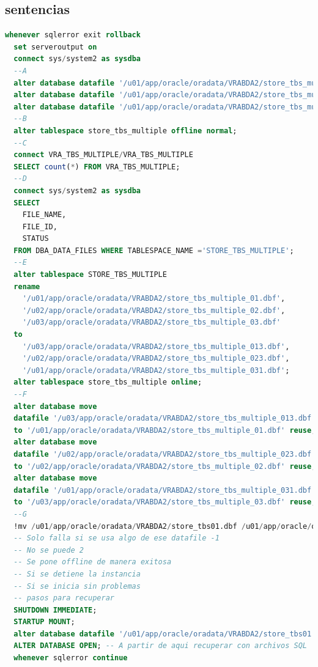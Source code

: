 \documentclass[journal]{IEEEtran}
\begin{document}
\subsection{sentencias}
\begin{lstlisting}[language=sql, caption=s-00-datafiles.sql,label={lst:codigo1}]
  whenever sqlerror exit rollback
  set serveroutput on
  connect sys/system2 as sysdba
  --A
  alter database datafile '/u01/app/oracle/oradata/VRABDA2/store_tbs_multiple_01.dbf' offline;
  alter database datafile '/u01/app/oracle/oradata/VRABDA2/store_tbs_multiple_02.dbf' offline;
  alter database datafile '/u01/app/oracle/oradata/VRABDA2/store_tbs_multiple_03.dbf' offline;
  --B
  alter tablespace store_tbs_multiple offline normal;
  --C
  connect VRA_TBS_MULTIPLE/VRA_TBS_MULTIPLE
  SELECT count(*) FROM VRA_TBS_MULTIPLE;
  --D
  connect sys/system2 as sysdba
  SELECT
    FILE_NAME,
    FILE_ID,
    STATUS
  FROM DBA_DATA_FILES WHERE TABLESPACE_NAME ='STORE_TBS_MULTIPLE';
  --E
  alter tablespace STORE_TBS_MULTIPLE 
  rename
    '/u01/app/oracle/oradata/VRABDA2/store_tbs_multiple_01.dbf',
    '/u02/app/oracle/oradata/VRABDA2/store_tbs_multiple_02.dbf',
    '/u03/app/oracle/oradata/VRABDA2/store_tbs_multiple_03.dbf'
  to 
    '/u03/app/oracle/oradata/VRABDA2/store_tbs_multiple_013.dbf',
    '/u02/app/oracle/oradata/VRABDA2/store_tbs_multiple_023.dbf',
    '/u01/app/oracle/oradata/VRABDA2/store_tbs_multiple_031.dbf';
  alter tablespace store_tbs_multiple online;
  --F
  alter database move
  datafile '/u03/app/oracle/oradata/VRABDA2/store_tbs_multiple_013.dbf'
  to '/u01/app/oracle/oradata/VRABDA2/store_tbs_multiple_01.dbf' reuse;
  alter database move
  datafile '/u02/app/oracle/oradata/VRABDA2/store_tbs_multiple_023.dbf'
  to '/u02/app/oracle/oradata/VRABDA2/store_tbs_multiple_02.dbf' reuse;
  alter database move
  datafile '/u01/app/oracle/oradata/VRABDA2/store_tbs_multiple_031.dbf'
  to '/u03/app/oracle/oradata/VRABDA2/store_tbs_multiple_03.dbf' reuse;
  --G
  !mv /u01/app/oracle/oradata/VRABDA2/store_tbs01.dbf /u01/app/oracle/oradata/VRABDA2/store_tbs01.dbfcopy
  -- Solo falla si se usa algo de ese datafile -1
  -- No se puede 2
  -- Se pone offline de manera exitosa
  -- Si se detiene la instancia
  -- Si se inicia sin problemas
  -- pasos para recuperar
  SHUTDOWN IMMEDIATE;
  STARTUP MOUNT;
  alter database datafile '/u01/app/oracle/oradata/VRABDA2/store_tbs01.dbf' offline for drop;
  ALTER DATABASE OPEN; -- A partir de aqui recuperar con archivos SQL
  whenever sqlerror continue  
\end{lstlisting}
\end{document}
